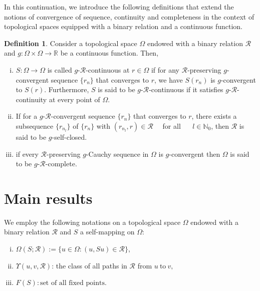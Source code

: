 \documentclass[10pt, reqno]{amsart}
\theoremstyle{definition}
\newtheorem{definition}[theorem]{Definition}
\theoremstyle{remark}
\numberwithin{equation}{section}
\begin{document}
In this continuation, we introduce the following definitions   that extend the notions of convergence of sequence, continuity and completeness  in the context of topological spaces equipped with a binary relation and a continuous function.  

\begin{definition}  
Consider a topological space $  \Omega $ endowed with a binary relation $\mathcal{R}$ and  $g: \Omega \times \Omega \to\mathbb{R}$  be a continuous function. Then,
	\begin{enumerate}[(i)]
		\item $ S : \Omega \rightarrow \Omega $ is called $g$-$\mathcal{R}$-continuous at $ r \in \Omega $ if for any $\mathcal{R}$-preserving $g$-convergent sequence $\{ r_{n}\}$ that converges  to $ r $, we have $ S ( r_{n} ) $ is  $g$-convergent to $ S( r ).$ Furthermore, $S $ is said to be $g$-$\mathcal{R}$-continuous if  it satisfies $g$-$\mathcal{R}$-continuity at every point of $ \Omega $.  
		\item If for a $g$-$\mathcal{R}$-convergent sequence $\{ r_{n} \} $ that converges to  $r $, there exists a subsequence $\{ r_{n_{l}}\}$ of $\{r_{n}\}$ with $ ( r_{n_{l}}, r )  \in \mathcal{R}$ ~~for all ~~ $ l \in \mathbb{N}_{0}$, then $\mathcal{R}$ is said to be $g$-self-closed.
         \item  if every $\mathcal{R}$-preserving $g$-Cauchy sequence in $\Omega$ is $g$-convergent then  $ \Omega $ is said to be $g$-$\mathcal{R}$-complete. 
	\end{enumerate}
\end{definition}



	
 




\section{Main results}

\noindent We employ the following notations on a topological space $\Omega$ endowed with a binary relation $\mathcal{R}$ and $ S $ a self-mapping  on   $\Omega$:
\begin{enumerate}[(i)]
	\item   $\Omega(S;\mathcal{R}):=\{ u \in \Omega :( u, S u )\in \mathcal{R}\}$,
	\item   $\Upsilon ( u, v, \mathcal{R} ) $:  the class of all paths in $ \mathcal{R} $  from $  u ~  \text{to}~ v ,$
	\item   $ F( S ): \text{set of all fixed points}.$	
\end{enumerate}	
\end{document}
